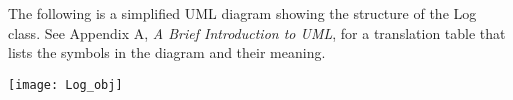 %


The following is a simplified UML diagram showing the structure of the
Log class.  See Appendix A, {\it A Brief Introduction to UML},
for a translation table that lists the symbols in the diagram and their 
meaning.

\begin{center}
\texttt{[image: Log\_obj]}   
\end{center}

